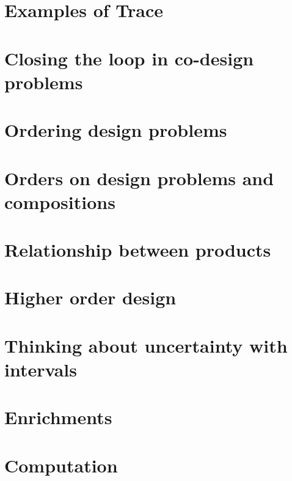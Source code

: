 \documentclass[paper=6in:9in,pagesize=pdftex,
 headinclude=off,footinclude=on,11pt,twoside]{scrbook}
\begin{document}
\chapter{Examples of Trace}

\clearpage
\chapter{Closing the loop in co-design problems}

\clearpage
\chapter{Ordering design problems}

\clearpage
\chapter{Orders on design problems and compositions}

\clearpage
\chapter{Relationship between products}

\clearpage
\chapter{Higher order design}

\clearpage
\chapter{Thinking about uncertainty with intervals}

\clearpage
\chapter{Enrichments}

\clearpage
\chapter{Computation}


%
%
%
%

\printbibliography
\end{document}
